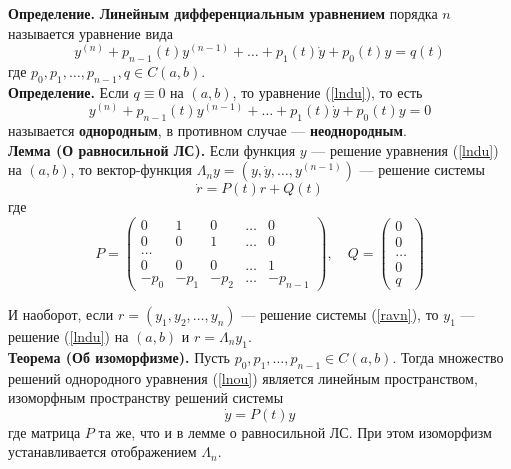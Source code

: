 \textbf{Определение.} \textbf{Линейным дифференциальным уравнением} порядка $n$ называется уравнение вида
\begin{equation}
    y^{(n)} + p_{n-1}(t)y^{(n - 1)} + \ldots + p_1(t)\dot{y} + p_0(t)y = q(t) \label{lndu}
\end{equation}
где $p_0, p_1, \ldots, p_{n-1}, q \in C(a,b)$.\\

\noindent \textbf{Определение.} Если $q \equiv 0$ на $(a,b)$, то уравнение (\ref{lndu}), то есть
\begin{equation}
    y^{(n)} + p_{n-1}(t)y^{(n - 1)} + \ldots + p_1(t)\dot{y} + p_0(t)y = 0 \label{lnou}
\end{equation}
называется \textbf{однородным}, в противном случае --- \textbf{неоднородным}.\\

\noindent \textbf{Лемма (О равносильной ЛС).} Если функция $y$ --- решение уравнения (\ref{lndu}) на $(a,b)$, то вектор-функция $\Lambda_n y = (y, \dot{y}, \ldots, y^{(n-1)})$ --- решение системы
\begin{equation}
    \dot{r} = P(t)r + Q(t) \label{ravn}
\end{equation}
где
\begin{equation*}
    P = \begin{pmatrix}
    0 & 1 & 0 & \ldots & 0\\
    0 & 0 & 1 & \ldots & 0\\
    \ldots\\
    0 & 0 & 0 & \ldots & 1\\
    -p_0 & -p_1 & -p_2 & \ldots & -p_{n - 1}
    \end{pmatrix}, \quad Q = \begin{pmatrix}
    0\\
    0\\
    \ldots\\
    0\\
    q
    \end{pmatrix}
\end{equation*}

И наоборот, если $r = (y_1, y_2, \ldots, y_n)$ --- решение системы (\ref{ravn}), то $y_1$ --- решение (\ref{lndu}) на $(a,b)$ и $r = \Lambda_n y_1$.\\

\noindent \textbf{Теорема (Об изоморфизме).} Пусть $p_0, p_1, \ldots, p_{n-1} \in C(a,b)$. Тогда множество решений однородного уравнения (\ref{lnou}) является линейным пространством, изоморфным пространству решений системы
\begin{equation}
    \dot{y} = P(t)y \label{izomorf}
\end{equation}
где матрица $P$ та же, что и в лемме о равносильной ЛС. При этом изоморфизм устанавливается отображением $\Lambda_n$.\\

